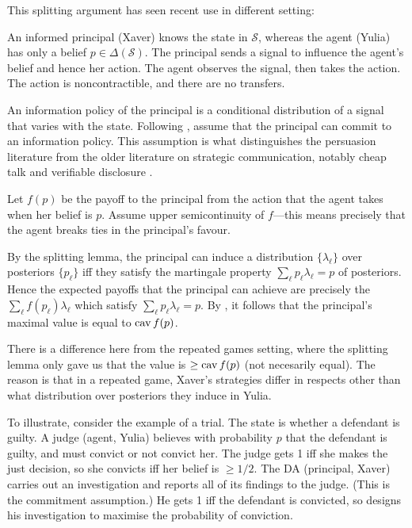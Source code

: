 \documentclass[11pt,letterpaper,reqno,oneside]{article}
\begin{document}
This splitting argument has seen recent use in different setting:
%
\begin{example}[persuasion]
	An informed principal (Xaver) knows the state in $\mathcal{S}$, whereas the agent (Yulia) has only a belief $p \in \Delta(\mathcal{S})$. The principal sends a signal to influence the agent's belief and hence her action. The agent observes the signal, then takes the action. The action is noncontractible, and there are no transfers.

	An information policy of the principal is a conditional distribution of a signal that varies with the state. Following \textcite{KamenicaGentzkow2011}, assume that the principal can commit to an information policy. This assumption is what distinguishes the persuasion literature from the older literature on strategic communication, notably cheap talk \parencite{CrawfordSobel1982} and verifiable disclosure \parencite{Grossman1981,Milgrom1981bell}.

	Let $f(p)$ be the payoff to the principal from the action that the agent takes when her belief is $p$. Assume upper semicontinuity of $f$---this means precisely that the agent breaks ties in the principal's favour.

	By the splitting lemma, the principal can induce a distribution $\{ \lambda_\ell \}$ over posteriors $\{ p_\ell \}$ iff they satisfy the martingale property $\sum_\ell p_\ell \lambda_\ell = p$ of posteriors. Hence the expected payoffs that the principal can achieve are precisely the $\sum_\ell f(p_\ell) \lambda_\ell$ which satisfy $\sum_\ell p_\ell \lambda_\ell = p$. By , it follows that the principal's maximal value is equal to $\operatorname*{cav} f(p)$.

	There is a difference here from the repeated games setting, where the splitting lemma only gave us that the value is $\geq \operatorname*{cav} f(p)$ (not necesarily equal). The reason is that in a repeated game, Xaver's strategies differ in respects other than what distribution over posteriors they induce in Yulia.

	To illustrate, consider the example of a trial. The state is whether a defendant is guilty. A judge (agent, Yulia) believes with probability $p$ that the defendant is guilty, and must convict or not convict her. The judge gets 1 iff she makes the just decision, so she convicts iff her belief is $\geq 1/2$. The DA (principal, Xaver) carries out an investigation and reports all of its findings to the judge. (This is the commitment assumption.) He gets 1 iff the defendant is convicted, so designs his investigation to maximise the probability of conviction.


\end{example}
\end{document}
